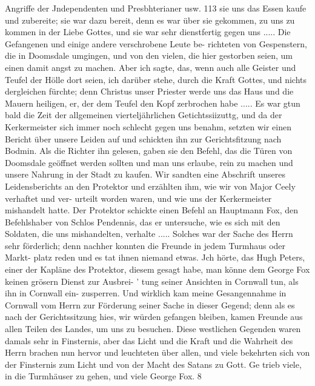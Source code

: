 Angriffe der Jndependenten und Presbhterianer usw. 113
sie uns das Essen kaufe und zubereite; sie war dazu bereit, denn
es war über sie gekommen, zu uns zu kommen in der Liebe
Gottes, und sie war sehr dienstfertig gegen uns .....
Die Gefangenen und einige andere verschrobene Leute be-
richteten von Gespenstern, die in Doomsdale umgingen, und von
den vielen, die hier gestorben seien, um einen damit angst zu
machen. Aber ich sagte, das, wenn auch alle Geister und Teufel
der Hölle dort seien, ich darüber stehe, durch die Kraft Gottes,
und nichts dergleichen fürchte; denn Christus unser Priester werde
uns das Haus und die Mauern heiligen, er, der dem Teufel den
Kopf zerbrochen habe .....
Es war gtun bald die Zeit der allgemeinen vierteljährlichen
Getichtssiizuttg, und da der Kerkermeister sich immer noch schlecht
gegen uns benahm, setzten wir einen Bericht über unsere Leiden
auf und schickten ihn zur Gerichtsfitzung nach Bodmin. Als die
Richter ihn gelesen, gaben sie den Befehl, das die Türen von
Doomsdale geöffnet werden sollten und man uns erlaube, rein
zu machen und unsere Nahrung in der Stadt zu kaufen. Wir
sandten eine Abschrift unseres Leidensberichts an den Protektor
und erzählten ihm, wie wir von Major Ceely verhaftet und ver-
urteilt worden waren, und wie uns der Kerkermeister mishandelt
hatte. Der Protektor schickte einen Befehl an Hauptmann Fox,
den Befehlshaber von Schlos Pendennis, das er untersuche, wie
es sich mit den Soldaten, die uns mishandelten, verhalte .....
Solches war der Sache des Herrn sehr förderlich; denn
nachher konnten die Freunde in jedem Turmhaus oder Markt-
platz reden und es tat ihnen niemand etwas. Jch hörte, das
Hugh Peters, einer der Kapläne des Protektor, diesem gesagt habe,
man könne dem George Fox keinen grösern Dienst zur Ausbrei-
’ tung seiner Ansichten in Cornwall tun, als ihn in Cornwall ein-
zusperren. Und wirklich kam meine Gesangennahme in Cornwall
vom Herrn zur Förderung seiner Sache in dieser Gegend; denn
als es nach der Gerichtssitzung hies, wir würden gefangen bleiben,
kamen Freunde aus allen Teilen des Landes, um uns zu besuchen.
Diese westlichen Gegenden waren damals sehr in Finsternis, aber
das Licht und die Kraft und die Wahrheit des Herrn brachen
nun hervor und leuchteten über allen, und viele bekehrten sich
von der Finsternis zum Licht und von der Macht des Satans
zu Gott. Ge trieb viele, in die Turmhäuser zu gehen, und viele
George Fox. 8


